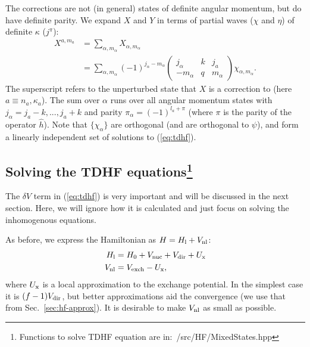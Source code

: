 \documentclass[10pt,twocolumn,a4paper]{article}%
\newcommand{\threej}[6]{\ensuremath{\begin{pmatrix}#1&#2&#3\\#4&#5&#6\end{pmatrix}}}	%
\renewcommand{\a}{\ensuremath{\alpha}}
\renewcommand{\k}{\ensuremath{\kappa}}
\newcommand{\vk}{\ensuremath{\varkappa}}
\begin{document}
The corrections are not (in general) states of definite angular momentum, but do have definite parity.
We expand $X$ and $Y$ in terms of partial waves ($\chi$ and $\eta$) of definite $\k$ ($j^\pi$):
\begin{equation}\begin{split}
\label{eq:dPsi-pw}
X^{a,m_a} &= \sum_{\a,m_\a} X_{\a,m_\a}\\
 &= \sum_{\a,m_\a}(-1)^{j_\a-m_\a}\threej{j_\a}{k}{j_a}{-m_\a}{q}{m_\a}\chi_{\a, m_\a}.
\end{split}\end{equation}
The superscript refers to the unperturbed state that $X$ is a correction to (here $a\equiv n_a,\k_a$).
The sum over $\alpha$ runs over all angular momentum states with $j_\alpha = j_a - k, ..., j_a+k$ and parity $\pi_\alpha = (-1)^{l_a + \pi}$ (where $\pi$ is the parity of the operator $\hat h$).
Note that $\{\chi_\a\}$ are orthogonal (and are orthogonal to $\psi$), and form a linearly independent set of solutions to (\ref{eq:tdhf}).




\subsection[Solving the TDHF equations]{Solving the TDHF equations\label{sec:tdhf-solve}\footnote{Functions to solve TDHF equation are in:~/src/HF/MixedStates.hpp}}

The $\delta V$ term in (\ref{eq:tdhf}) is very important and will be discussed in the next section. 
Here, we will ignore how it is calculated and just focus on solving the inhomogenous equations. 


As before, we express the Hamiltonian as $H =H_{\rm l} + V_{\rm nl} $: %
\begin{align}
H_{\rm l}&= H_0 + V_{\rm nuc} +  V_{\rm dir} +  U_{\rm x} \\
V_{\rm nl} &= V_{\rm exch} - U_{\rm x},
\end{align}
where $U_{\rm x}$ is a local approximation to the exchange potential.
In the simplest case it is $(f-1)V_{\rm dir}$, but better approximations aid the convergence (we use that from Sec.~\ref{sec:hf-approx}).
It is desirable to make  $V_{\rm nl}$ as small as possible.
%
\end{document}
